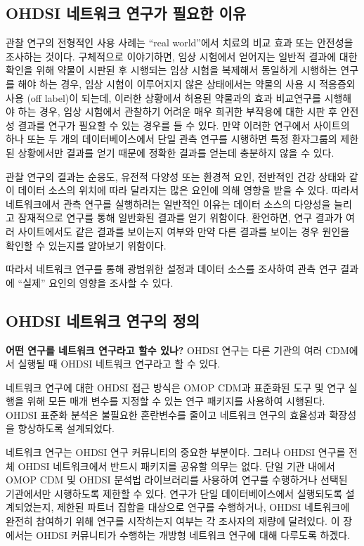 \documentclass[11pt]{book}
\theoremstyle{definition}
\theoremstyle{definition}
\theoremstyle{definition}
\theoremstyle{remark}
\let\BeginKnitrBlock\begin \let\EndKnitrBlock\end
\begin{document}
\subsection{OHDSI 네트워크 연구가 필요한 이유}\label{ohdsi----}

관찰 연구의 전형적인 사용 사례는 ``real world''에서 치료의 비교 효과
또는 안전성을 조사하는 것이다. 구체적으로 이야기하면, 임상 시험에서
얻어지는 일반적 결과에 대한 확인을 위해 약물이 시판된 후 시행되는 임상
시험을 복제해서 동일하게 시행하는 연구를 해야 하는 경우, 임상 시험이
이루어지지 않은 상태에서는 약물의 사용 시 적응증외 사용 (off label)이
되는데, 이러한 상황에서 허용된 약물과의 효과 비교연구를 시행해야 하는
경우, 임상 시험에서 관찰하기 어려운 매우 희귀한 부작용에 대한 시판 후
안전성 결과를 연구가 필요할 수 있는 경우를 들 수 있다. 만약 이러한
연구에서 사이트의 하나 또는 두 개의 데이터베이스에서 단일 관측 연구를
시행하면 특정 환자그룹의 제한된 상황에서만 결과를 얻기 때문에 정확한
결과를 얻는데 충분하지 않을 수 있다.

관찰 연구의 결과는 순응도, 유전적 다양성 또는 환경적 요인, 전반적인 건강
상태와 같이 데이터 소스의 위치에 따라 달라지는 많은 요인에 의해 영향을
받을 수 있다. 따라서 네트워크에서 관측 연구를 실행하려는 일반적인 이유는
데이터 소스의 다양성을 늘리고 잠재적으로 연구를 통해 일반화된 결과를
얻기 위함이다. 환언하면, 연구 결과가 여러 사이트에서도 같은 결과를
보이는지 여부와 만약 다른 결과를 보이는 경우 원인을 확인할 수 있는지를
알아보기 위함이다.

따라서 네트워크 연구를 통해 광범위한 설정과 데이터 소스를 조사하여 관측
연구 결과에 ``실제'' 요인의 영향을 조사할 수 있다.

\subsection{OHDSI 네트워크 연구의 정의}\label{ohdsi---}

\BeginKnitrBlock{rmdimportant}
\textbf{어떤 연구를 네트워크 연구라고 할수 있나?} OHDSI 연구는 다른
기관의 여러 CDM에서 실행될 때 OHDSI 네트워크 연구라고 할 수 있다.
\EndKnitrBlock{rmdimportant}

네트워크 연구에 대한 OHDSI 접근 방식은 OMOP CDM과 표준화된 도구 및 연구
실행을 위해 모든 매개 변수를 지정할 수 있는 연구 패키지를 사용하여
시행된다. OHDSI 표준화 분석은 불필요한 혼란변수를 줄이고 네트워크 연구의
효율성과 확장성을 향상하도록 설계되었다.

네트워크 연구는 OHDSI 연구 커뮤니티의 중요한 부분이다. 그러나 OHDSI
연구를 전체 OHDSI 네트워크에서 반드시 패키지를 공유할 의무는 없다. 단일
기관 내에서 OMOP CDM 및 OHDSI 분석법 라이브러리를 사용하여 연구를
수행하거나 선택된 기관에서만 시행하도록 제한할 수 있다. 연구가 단일
데이터베이스에서 실행되도록 설계되었는지, 제한된 파트너 집합을 대상으로
연구를 수행하거나, OHDSI 네트워크에 완전히 참여하기 위해 연구를
시작하는지 여부는 각 조사자의 재량에 달려있다. 이 장에서는 OHDSI
커뮤니티가 수행하는 개방형 네트워크 연구에 대해 다루도록 하겠다.
\end{document}
